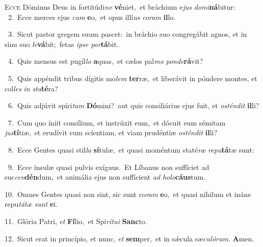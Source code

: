 \lettrine{\initial\textcolor{\initialcolor}{E}}{cce} Dóminus Deus in fortitúdi\textit{ne} \textbf{vé}\-niet,~\star et bráchium e\textit{jus} \textit{do}\-\textit{mi}\textbf{ná}bitur:\\
{\numbfont\textcolor{\numbcolor}{~2.}}~Ecce merces ejus \textit{cum} \textbf{e}\-o,~\star et opus illí\textit{us} \textit{co}\-\textit{ram} \textbf{il}\-lo.\par
{\numbfont\textcolor{\numbcolor}{~3.}}~Sicut pastor gregem suum pascet:~\dagger in bráchio suo congregábit agnos, et in sinu suo \textit{le}\-\textbf{vá}bit;~\star fetas \textit{ip}\-\textit{se} \textit{por}\-\textbf{tá}bit.\par
{\numbfont\textcolor{\numbcolor}{~4.}}~Quis mensus est pugíl\textit{lo} \textbf{a}\-quas,~\star et cælos pal\textit{mo} \textit{pon}\-\textit{de}\textbf{rá}vit?\par
{\numbfont\textcolor{\numbcolor}{~5.}}~Quis appéndit tribus dígitis mo\textit{lem} \textbf{ter}\-ræ,~\star et liberávit in póndere montes, et col\textit{les} \textit{in} \textit{sta}\-\textbf{té}ra?\par
{\numbfont\textcolor{\numbcolor}{~6.}}~Quis adjúvit spíri\textit{tum} \textbf{Dó}\-mini?~\star aut quis consiliárius ejus fuit, et \textit{os}\-\textit{tén}\textit{dit} \textbf{il}\-li?\par
{\numbfont\textcolor{\numbcolor}{~7.}}~Cum quo íniit consílium, et instrúxit eum,~\dagger et dócuit eum sémitam \textit{jus}\-\textbf{tí}tiæ,~\star et erudívit eum scíentiam, et viam prudéntiæ \textit{os}\-\textit{tén}\textit{dit} \textbf{il}\-li?\par
{\numbfont\textcolor{\numbcolor}{~8.}}~Ecce Gentes quasi stil\textit{la} \textbf{sí}\-tulæ,~\star et quasi moméntum staté\textit{ræ} \textit{re}\-\textit{pu}\textbf{tá}tæ sunt:\par
{\numbfont\textcolor{\numbcolor}{~9.}}~Ecce ínsulæ quasi pulvis exíguus.~\dagger Et Líbanus non suffíciet ad suc\-\textit{cen}\-\textbf{dén}dum,~\star et animália ejus non suffícient \textit{ad} \textit{ho}\-\textit{lo}\textbf{cáus}tum.\par
{\numbfont\textcolor{\numbcolor}{10.}}~Omnes Gentes quasi non sint, sic sunt co\textit{ram} \textbf{e}\-o,~\star et quasi níhilum et ináne repu\-\textit{tá}\-\textit{tæ} \textit{sunt} \textbf{e}\-i.\par
{\numbfont\textcolor{\numbcolor}{11.}}~Glória Patri, \textit{et} \textbf{Fí}\-lio,~\star et Spi\-\textit{rí}\-\textit{tu}\textit{i} \textbf{Sanc}\-to.\par
{\numbfont\textcolor{\numbcolor}{12.}}~Sicut erat in princípio, et nunc, \textit{et} \textbf{sem}\-per,~\star et in sǽcula sæ\-\textit{cu}\-\textit{ló}\textit{rum}. \textbf{A}\-men.\par

